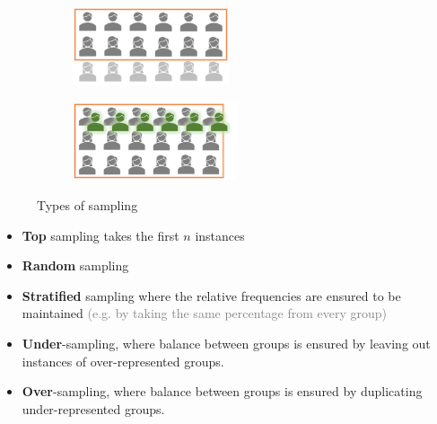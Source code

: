 \begin{figure}[h]
  \vspace*{0.2cm}
  \begin{subfigure}{0.4\textwidth}
    \centering
    \includegraphics[height=2.3cm]{assets/visualization_and_extraction/prep/sample_under.png}
  \end{subfigure}
  \begin{subfigure}{0.4\textwidth}
    \centering
    \includegraphics[height=2.3cm]{assets/visualization_and_extraction/prep/sample_over.png}
  \end{subfigure}
  \caption{Types of sampling}
  \label{fig:2_sampling_types}
\end{figure}

\begin{itemize}
  \item \textbf{Top} sampling takes the first $n$ instances
  \item \textbf{Random} sampling
  \item \textbf{Stratified} sampling where the relative frequencies are ensured to be maintained \textcolor{gray}{\footnotesize (e.g. by taking the same percentage from every group)}
  \item \textbf{Under}-sampling, where balance between groups is ensured by leaving out instances of over-represented groups.
  \item \textbf{Over}-sampling, where balance between groups is ensured by duplicating under-represented groups.
\end{itemize}

